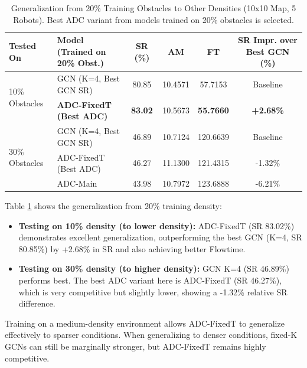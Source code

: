\begin{table}[htbp]
    \centering
    \caption{Generalization from 20\% Training Obstacles to Other Densities (10x10 Map, 5 Robots). Best ADC variant from models trained on 20\% obstacles is selected.}
    \label{tab:gen_20D_to_others_revised}
    \scriptsize
    \begin{tabular}{llcccc}
        \toprule
        Tested On & Model (Trained on 20\% Obst.) & SR (\%) & AM & FT & SR Impr. over Best GCN (\%) \\
        \midrule
        \multirow{2}{*}{10\% Obstacles} %
        & GCN (K=4, Best GCN SR) & 80.85 & 10.4571 & 57.7153 & Baseline \\
        & \textbf{ADC-FixedT (Best ADC)} & \textbf{83.02} & 10.5673 & \textbf{55.7660} & \textbf{+2.68\%} \\
        \midrule
        \multirow{3}{*}{30\% Obstacles} %
        & GCN (K=4, Best GCN SR) & 46.89 & 10.7124 & 120.6639 & Baseline \\
        & ADC-FixedT (Best ADC) & 46.27 & 11.1300 & 121.4315 & -1.32\% \\
        & ADC-Main & 43.98 & 10.7972 & 123.6888 & -6.21\% \\
        \bottomrule
    \end{tabular}
\end{table}
Table \ref{tab:gen_20D_to_others_revised} shows the generalization from 20\% training density:
\begin{itemize}
    \item \textbf{Testing on 10\% density (to lower density):} ADC-FixedT (SR 83.02\%) demonstrates excellent generalization, outperforming the best GCN (K=4, SR 80.85\%) by +2.68\% in SR and also achieving better Flowtime.
    \item \textbf{Testing on 30\% density (to higher density):} GCN K=4 (SR 46.89\%) performs best. The best ADC variant here is ADC-FixedT (SR 46.27\%), which is very competitive but slightly lower, showing a -1.32\% relative SR difference.
\end{itemize}
Training on a medium-density environment allows ADC-FixedT to generalize effectively to sparser conditions. When generalizing to denser conditions, fixed-K GCNs can still be marginally stronger, but ADC-FixedT remains highly competitive.

